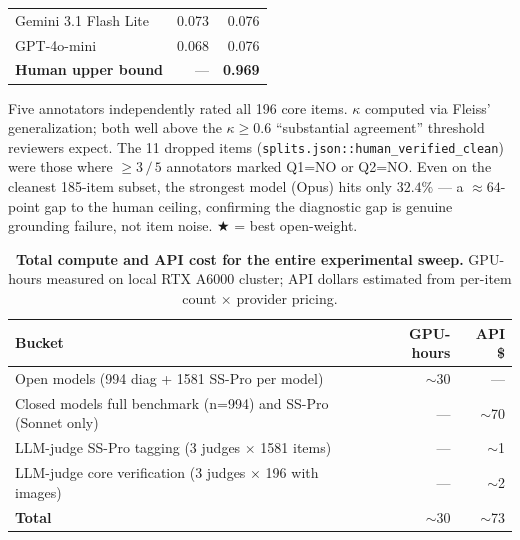 \begin{table}[t]
\begin{threeparttable}
\begin{tabular}{@{}lrr@{}}
Gemini 3.1 Flash Lite          & 0.073 & 0.076 \\
GPT-4o-mini                    & 0.068 & 0.076 \\
\midrule
\textbf{Human upper bound}     & ---   & \textbf{0.969} \\
\bottomrule
\end{tabular}
\begin{tablenotes}
\footnotesize
\item Five annotators independently rated all 196 core items.
$\kappa$ computed via Fleiss' generalization; both well above the
$\kappa{\ge}0.6$ ``substantial agreement'' threshold reviewers
expect. The 11 dropped items (\texttt{splits.json::human\_verified\_clean})
were those where $\ge 3{\,}/{\,}5$ annotators marked Q1=NO or Q2=NO.
Even on the cleanest 185-item subset, the strongest model (Opus) hits
only $32.4\%$ --- a $\approx 64$-point gap to the human ceiling,
confirming the diagnostic gap is genuine grounding failure, not item
noise. $\bigstar$ = best open-weight.
\end{tablenotes}
\end{threeparttable}
\end{table}


\begin{table}[t]
\centering
\small
\begin{threeparttable}
\caption{\textbf{Total compute and API cost for the entire experimental sweep.}
GPU-hours measured on local RTX A6000 cluster; API dollars estimated from
per-item count $\times$ provider pricing.}
\label{tab:cost}
\begin{tabular}{@{}lrr@{}}
\toprule
\textbf{Bucket} & \textbf{GPU-hours} & \textbf{API \$} \\
\midrule
Open models (994 diag + 1581 SS-Pro per model) & $\sim$30 & --- \\
Closed models full benchmark (n=994) and SS-Pro (Sonnet only) & --- & $\sim$70 \\
LLM-judge SS-Pro tagging (3 judges $\times$ 1581 items) & --- & $\sim$1 \\
LLM-judge core verification (3 judges $\times$ 196 with images) & --- & $\sim$2 \\
\midrule
\textbf{Total} & $\sim$30 & $\sim$73 \\
\bottomrule
\end{tabular}
\end{threeparttable}
\end{table}


